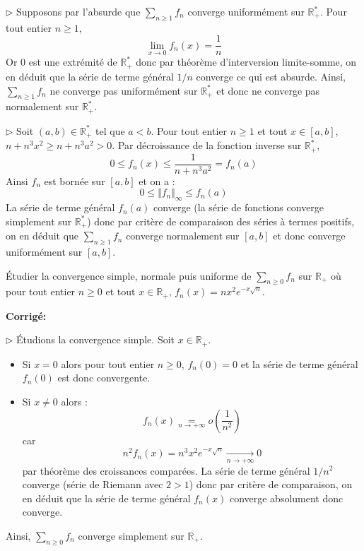 \documentclass[a4paper,twoside,french,11pt]{VcCours}
\newcommand{\Sum}[2]{\sum_{#1}^{#2}}
\newcommand{\corr}{\textbf{Corrigé:}}
\begin{document}
\medskip

$\rhd$ Supposons par l'absurde que $\Sum{n\geq 1}{} f_n$ converge uniformément sur $\mathbb{R}_+^*$. Pour tout entier $n \geq 1$,
$$ \lim_{x \rightarrow 0} f_n(x) = \dfrac{1}{n}$$
Or $0$ est une extrémité de $\mathbb{R}_+^*$ donc par théorème d'interversion limite-somme, on en déduit que la série de terme général $1/n$ converge ce qui est absurde. Ainsi, $\Sum{n\geq 1}{} f_n$ ne converge pas uniformément sur $\mathbb{R}_+^*$ et donc ne converge pas normalement sur $\mathbb{R}_+^*$.

\medskip

$\rhd$ Soit $(a,b) \in \mathbb{R}_+^*$ tel que $a<b$. Pour tout entier $n \geq 1$ et tout $x \in [a,b]$, $n+n^3x^2 \geq n+n^3a^2 >0$. Par décroissance de la fonction inverse sur $\mathbb{R}_+^*$,
$$ 0 \leq f_n(x) \leq \dfrac{1}{n+n^3a^2} = f_n(a)$$
Ainsi $f_n$ est bornée sur $[a,b]$ et on a :
$$ 0 \leq \Vert f_n \Vert_{\infty} \leq f_n(a)$$
La série de terme général $f_n(a)$ converge (la série de fonctions converge simplement sur $\mathbb{R}_+^*$) donc par critère de comparaison des séries à termes positifs, on en déduit que $\Sum{n\geq 1}{} f_n$ converge normalement sur $[a,b]$ et donc converge uniformément sur $[a,b]$.

\medskip


\begin{Exercice}{}\label{doublon} Étudier la convergence simple, normale puis uniforme de $\Sum{n\geq 0}{} f_n$ sur $\mathbb{R}_+$ où pour tout entier $n \geq 0$ et tout $x \in \mathbb{R}_+$, $f_n(x) = nx^2e^{-x\sqrt{n}}.$
\end{Exercice}

\corr 

$\rhd$ Étudions la convergence simple. Soit $x \in \mathbb{R}_+$.

\begin{itemize}
\item Si $x=0$ alors pour tout entier $n \geq 0$, $f_n(0)=0$ et la série de terme général $f_n(0)$ est donc convergente.
\item Si $x \neq 0$ alors :
$$ f_n(x) \underset{n \rightarrow + \infty}{=} o \left( \dfrac{1}{n^2} \right)$$
car 
$$ n^2f_n(x) = n^3x^2e^{-x\sqrt{n}} \underset{n \rightarrow + \infty}{\longrightarrow} 0$$
par théorème des croissances comparées. La série de terme général $1/n^2$ converge (série de Riemann avec $2>1$) donc par critère de comparaison, on en déduit que la série de terme général $f_n(x)$ converge absolument donc converge.
\end{itemize}
Ainsi, $\Sum{n\geq 0}{} f_n$ converge simplement sur $\mathbb{R}_+$.
\end{document}
